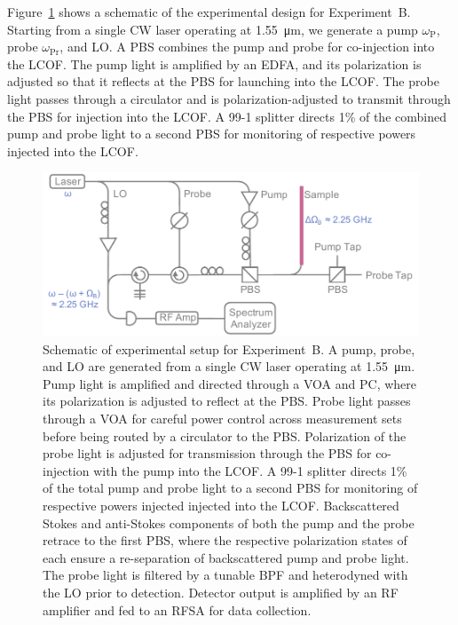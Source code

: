 Figure~\ref{fig:Cooling:ExperimentBDesign} shows a schematic of the experimental design for Experiment~B. Starting from a single \ac{CW} laser operating at \SI{1.55}{\micro\meter}, we generate a pump \(\omega_{\mathrm{P}}\), probe \(\omega_{\mathrm{Pr}}\), and \ac{LO}. A \ac{PBS} combines the pump and probe for co-injection into the \ac{LCOF}. The pump light is amplified by an \ac{EDFA}, and its polarization is adjusted so that it reflects at the \ac{PBS} for launching into the \ac{LCOF}. The probe light passes through a circulator and is polarization-adjusted to transmit through the \ac{PBS} for injection into the \ac{LCOF}. A 99-1 splitter directs 1\% of the combined pump and probe light to a second \ac{PBS} for monitoring of respective powers injected into the \ac{LCOF}.

\begin{figure}[t]
  \centering
  \includegraphics[width=\textwidth]{figs/2-Cooling/pumpProbeDesign.pdf}
  \caption{Schematic of experimental setup for Experiment~B. A pump, probe, and \ac{LO} are generated from a single \ac{CW} laser operating at \SI{1.55}{\micro\meter}. Pump light is amplified and directed through a \ac{VOA} and \ac{PC}, where its polarization is adjusted to reflect at the \ac{PBS}. Probe light passes through a \ac{VOA} for careful power control across measurement sets before being routed by a circulator to the \ac{PBS}. Polarization of the probe light is adjusted for transmission through the \ac{PBS} for co-injection with the pump into the \ac{LCOF}. A 99-1 splitter directs 1\% of the total pump and probe light to a second \ac{PBS} for monitoring of respective powers injected injected into the \ac{LCOF}. Backscattered Stokes and anti-Stokes components of both the pump and the probe retrace to the first \ac{PBS}, where the respective polarization states of each ensure a re-separation of backscattered pump and probe light. The probe light is filtered by a tunable \ac{BPF} and heterodyned with the \ac{LO} prior to detection. Detector output is amplified by an \ac{RF} amplifier and fed to an \ac{RFSA} for data collection.}
  \label{fig:Cooling:ExperimentBDesign}
\end{figure}

